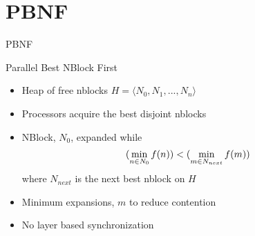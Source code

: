 \documentclass[style=unh]{powerdot}
\begin{document}

\section{PBNF}


\begin{slide}{PBNF}
  \vspace{.2in}
  \begin{center}
    Parallel Best NBlock First
  \end{center}

  \begin{itemize}
  \item Heap of free nblocks $H = \langle N_0, N_1, ..., N_n \rangle$
  \item Processors acquire the best disjoint nblocks
  \item NBlock, $N_0$, expanded while
    \begin{eqnarray*}
      (\mathop{\rm min}_{n \in N_0} f(n)) < (\mathop{\rm min}_{m \in N_{next}} f(m))
    \end{eqnarray*}
    where $N_{next}$ is the next best nblock on $H$
  \item Minimum expansions, $m$ to reduce contention
  \item No layer based synchronization
  \end{itemize}

\end{slide}

\end{document}

